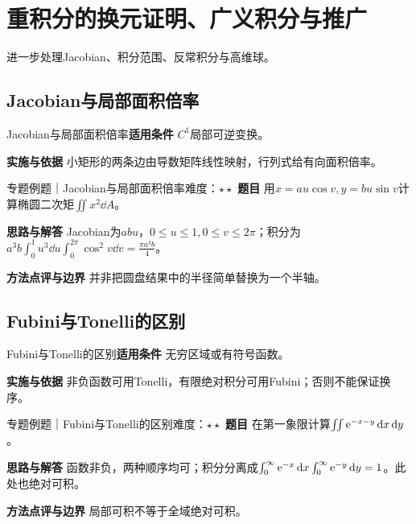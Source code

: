 \section{重积分的换元证明、广义积分与推广}\label{mat:multiple}
\begin{examtip}进一步处理Jacobian、积分范围、反常积分与高维球。\end{examtip}
\subsection{Jacobian与局部面积倍率}\label{mat:multiple:jacproof}
\begin{method}{Jacobian与局部面积倍率}\textbf{适用条件} $C^1$局部可逆变换。\par\textbf{实施与依据} 小矩形的两条边由导数矩阵线性映射，行列式给有向面积倍率。\end{method}
\begin{example}{专题例题｜Jacobian与局部面积倍率}{难度：$\star\star$}
\textbf{题目} 用$x=au\cos v,y=bu\sin v$计算椭圆二次矩$\iint x^2\dd A$。\par\textbf{思路与解答} Jacobian为$abu$，$0\le u\le1,0\le v\le2\pi$；积分为$a^3b\int_0^1u^3\dd u\int_0^{2\pi}\cos^2v\dd v=\frac{\pi a^3b}{4}$。\par\textbf{方法点评与边界} 并非把圆盘结果中的半径简单替换为一个半轴。
\end{example}
\subsection{Fubini与Tonelli的区别}\label{mat:multiple:tonelli}
\begin{method}{Fubini与Tonelli的区别}\textbf{适用条件} 无穷区域或有符号函数。\par\textbf{实施与依据} 非负函数可用Tonelli，有限绝对积分可用Fubini；否则不能保证换序。\end{method}
\begin{example}{专题例题｜Fubini与Tonelli的区别}{难度：$\star\star$}
\textbf{题目} 在第一象限计算$\iint\mathrm{e}^{-x-y}\mathop{}\!\mathrm{d} x\mathop{}\!\mathrm{d} y$。\par\textbf{思路与解答} 函数非负，两种顺序均可；积分分离成$\int_0^\infty\mathrm{e}^{-x}\mathop{}\!\mathrm{d} x\int_0^\infty\mathrm{e}^{-y}\mathop{}\!\mathrm{d} y=1$。此处也绝对可积。\par\textbf{方法点评与边界} 局部可积不等于全域绝对可积。
\end{example}

